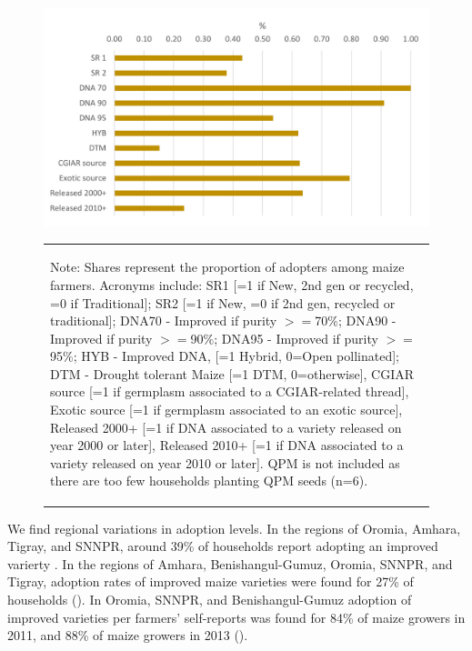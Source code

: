 \documentclass[11pt]{article}
\begin{document}
\begin{figure}[htpb]
    \centering
    \caption{Adoption rates of improved varieties in 2018 (by self-report, purity level, crop type, source and year of release)}\label{fig:adoption_r4}
    \includegraphics[width=.7\textwidth]{results/figures/adoption_r4.png}
    \begin{table}[H]
    \centering
        \begin{tabular}{p{}} 
            \begin{tablenotes}
                  \small
                  \item Note: Shares represent the proportion of adopters among maize farmers. Acronyms include: SR1 [=1 if New, 2nd gen or recycled, =0 if Traditional]; SR2  [=1 if New, =0 if 2nd gen, recycled or traditional]; DNA70 - Improved if purity $>=$70$\%$; DNA90 - Improved if purity $>=$90$\%$; DNA95 - Improved if purity $>=$95$\%$; HYB - Improved DNA, [=1 Hybrid, 0=Open pollinated]; DTM - Drought tolerant Maize [=1 DTM, 0=otherwise], CGIAR source [=1 if germplasm associated to a CGIAR-related thread], Exotic source [=1 if germplasm associated to an exotic source], Released 2000+ [=1 if DNA associated to a variety released on year 2000 or later], Released 2010+ [=1 if DNA associated to a variety released on year 2010 or later]. QPM is not included as there are too few households planting QPM seeds (n=6).
            \end{tablenotes}
        \end{tabular}
    \end{table}   
\end{figure}

We find regional variations in adoption levels. In the regions of Oromia, Amhara, Tigray, and SNNPR, around 39\% of households report adopting an improved varierty . In the regions of Amhara, Benishangul-Gumuz, Oromia, SNNPR, and Tigray, adoption rates of improved maize varieties were found for 27\% of households (\citealp{Jaleta2018-oj}). In Oromia, SNNPR, and Benishangul-Gumuz adoption of improved varieties per farmers’ self-reports was found for 84\% of maize growers in 2011, and 88\% of maize growers in 2013 (\citealp{Yirga17}).
\end{document}
